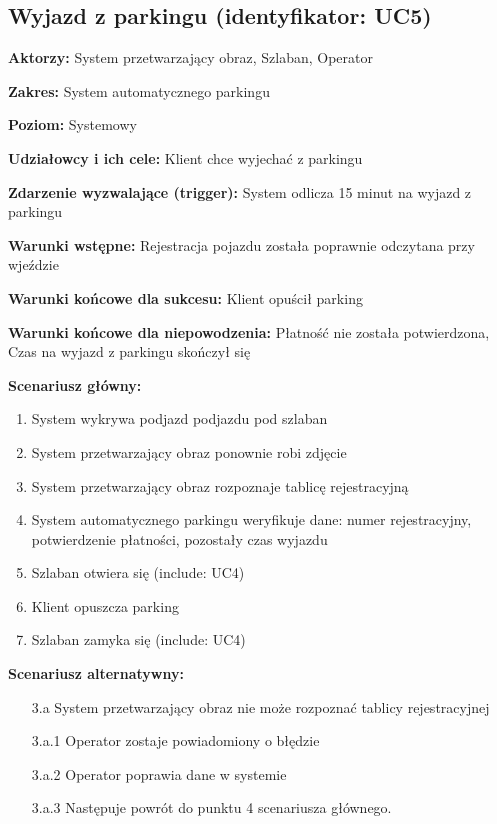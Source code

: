 \subsection{Wyjazd z parkingu (identyfikator: UC5)}
\textbf{Aktorzy: }System przetwarzający obraz, Szlaban, Operator

\hspace{0cm}\textbf{Zakres: }System automatycznego parkingu

\hspace{0cm}\textbf{Poziom: }Systemowy

\hspace{0cm}\textbf{Udziałowcy i ich cele: }Klient chce wyjechać z parkingu

\hspace{0cm}\textbf{Zdarzenie wyzwalające (trigger): } System odlicza 15 minut na wyjazd z parkingu

\hspace{0cm}\textbf{Warunki wstępne: }
Rejestracja pojazdu została poprawnie odczytana przy wjeździe

\hspace{0cm}\textbf{Warunki końcowe dla sukcesu: }Klient opuścił parking

\hspace{0cm}\textbf{Warunki końcowe dla niepowodzenia: }Płatność nie została potwierdzona, Czas na wyjazd z parkingu skończył się \newline

\hspace{0cm}\textbf{Scenariusz główny: }
\begin{enumerate}
\item System wykrywa podjazd podjazdu pod szlaban
\item System przetwarzający obraz ponownie robi zdjęcie
\item System przetwarzający obraz rozpoznaje tablicę rejestracyjną
\item System automatycznego parkingu weryfikuje dane: numer rejestracyjny, potwierdzenie płatności, pozostały czas wyjazdu
\item Szlaban otwiera się (include: UC4)
\item Klient opuszcza parking
\item Szlaban zamyka się (include: UC4)
\end{enumerate}
\hspace{0cm}\textbf{Scenariusz alternatywny: }
\begin{enumerate}
\item[3.a] System przetwarzający obraz nie może rozpoznać tablicy rejestracyjnej
\item[3.a.1] Operator zostaje powiadomiony o błędzie
\item[3.a.2] Operator poprawia dane w systemie
\item[3.a.3] Następuje powrót do punktu 4 scenariusza głównego.
\end{enumerate}


